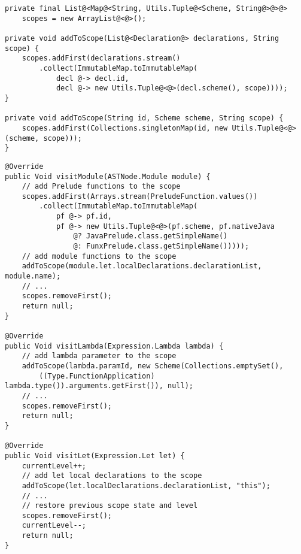 \vspace{4mm}
\begin{lstlisting}[caption={Struttura e metodi per lo \textit{scope}}, style=javaCode, label={lst:5-12-scope-stack-methods-java}]
private final List@<Map@<String, Utils.Tuple@<Scheme, String@>@>@>
    scopes = new ArrayList@<@>();

private void addToScope(List@<Declaration@> declarations, String scope) {
    scopes.addFirst(declarations.stream()
        .collect(ImmutableMap.toImmutableMap(
            decl @-> decl.id,
            decl @-> new Utils.Tuple@<@>(decl.scheme(), scope))));
}

private void addToScope(String id, Scheme scheme, String scope) {
    scopes.addFirst(Collections.singletonMap(id, new Utils.Tuple@<@>(scheme, scope)));
}
\end{lstlisting}
\vspace{4mm}
\begin{lstlisting}[caption={Aggiunta di contesto per modulo, lambda astrazioni e \texttt{let}}, style=javaCode, label={lst:5-12-lambda-let-scope-java}]
@Override
public Void visitModule(ASTNode.Module module) {
    // add Prelude functions to the scope
    scopes.addFirst(Arrays.stream(PreludeFunction.values())
        .collect(ImmutableMap.toImmutableMap(
            pf @-> pf.id,
            pf @-> new Utils.Tuple@<@>(pf.scheme, pf.nativeJava
                @? JavaPrelude.class.getSimpleName()
                @: FunxPrelude.class.getSimpleName()))));
    // add module functions to the scope
    addToScope(module.let.localDeclarations.declarationList, module.name);
    // ...
    scopes.removeFirst();
    return null;
}

@Override
public Void visitLambda(Expression.Lambda lambda) {
    // add lambda parameter to the scope
    addToScope(lambda.paramId, new Scheme(Collections.emptySet(),
        ((Type.FunctionApplication) lambda.type()).arguments.getFirst()), null);
    // ...
    scopes.removeFirst();
    return null;
}

@Override
public Void visitLet(Expression.Let let) {
    currentLevel++;
    // add let local declarations to the scope
    addToScope(let.localDeclarations.declarationList, "this");
    // ...
    // restore previous scope state and level
    scopes.removeFirst();
    currentLevel--;
    return null;
}
\end{lstlisting}

\newpage


